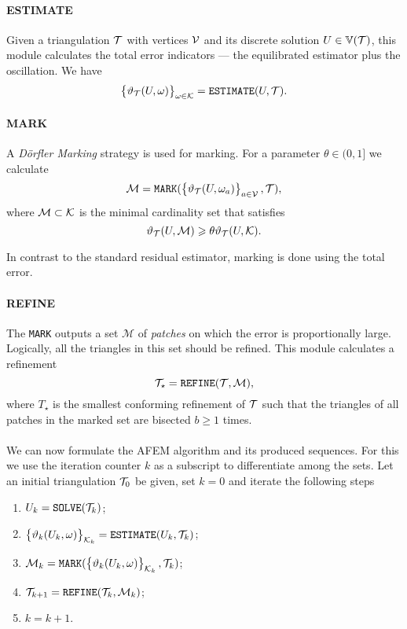 \documentclass[thesis.tex]{subfiles}
\begin{document}
\paragraph{ESTIMATE} Given a triangulation $\mathcal{T}$ with vertices $\mathcal{V}$ and its discrete solution $U \in \mathbb{V}(\mathcal{T})$, this module 
calculates the total error indicators --- the equilibrated estimator plus the oscillation. We have
\[
  \set{\vartheta_{\mathcal{T}}(U, \omega)}_{\omega \in \mathcal{K}} = \texttt{ESTIMATE}(U, \mathcal{T}).
\]
\paragraph{MARK}
A \emph{D\"orfler Marking} strategy is used for marking. For a parameter $\theta \in (0,1]$ we calculate
\[
  \mathcal{M} = \texttt{MARK}( \set{\vartheta_{\mathcal{T}}(U, \omega_a)}_{a \in \mathcal{V}}, \mathcal{T}),
\]
where $\mathcal{M} \subset \mathcal{K}$ is the minimal cardinality set that satisfies
\[
  \vartheta_{\mathcal{T}}(U,\mathcal{M}) \geqslant \theta \vartheta_{\mathcal{T}}(U, \mathcal{K}).
\]
\begin{rem}
  In contrast to the standard residual estimator, marking is done using the total error.
\end{rem}
\paragraph{REFINE}
The \texttt{MARK} outputs a set $\mathcal{M}$ of \emph{patches} on which the error is proportionally large. 
Logically, all the triangles in this set should be refined. This module calculates a refinement
\[
  \mathcal{T}_\star = \texttt{REFINE}(\mathcal{T}, \mathcal{M}),
\]
where $T_\star$ is the smallest conforming refinement of $\mathcal{T}$ such that the triangles of
all patches in the marked set are bisected $b \geq 1$ times.
\\\\
We can now formulate the AFEM algorithm and its produced sequences. For this we use the
iteration counter $k$ as a subscript to differentiate among the sets.
Let an initial triangulation $\mathcal{T}_0$ be given, set $k = 0$ and iterate the following steps
\begin{enumerate}
\item $U_k = \texttt{SOLVE}(\mathcal{T}_k)$;
\item $\set{\vartheta_k(U_k, \omega)}_{\mathcal{K}_k} = \texttt{ESTIMATE}(U_k, \mathcal{T}_k)$;
  \item $\mathcal{M}_k = \texttt{MARK}(\set{\vartheta_k(U_k, \omega)}_{\mathcal{K}_k}, \mathcal{T}_k)$;
  \item $\mathcal{T}_{k+1} = \texttt{REFINE}(\mathcal{T}_k, \mathcal{M}_k)$;
  \item $k  = k + 1$.
\end{enumerate}
\end{document}
